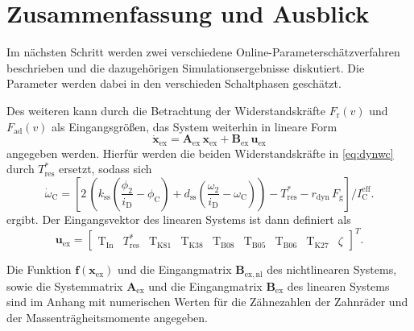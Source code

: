 \chapter{Zusammenfassung und Ausblick}\label{ch:ch4}
Im nächsten Schritt werden zwei verschiedene Online-Parameterschätzverfahren beschrieben und die dazugehörigen Simulationsergebnisse diskutiert. Die Parameter werden dabei in den verschieden Schaltphasen geschätzt.

Des weiteren kann durch die Betrachtung der Widerstandskräfte $F_\mathrm{r}(v)$ und $F_\mathrm{ad}(v)$ als Eingangsgrößen, das System weiterhin in lineare Form
\begin{equation}\label{eq:sys_linex}
\dot{\pmb{x}}_\mathrm{ex} = \pmb{A}_\mathrm{ex}\,\pmb{x}_\mathrm{ex} + \pmb{B}_\mathrm{ex}\,\pmb{u}_\mathrm{ex}
\end{equation}
angegeben werden. Hierfür werden die beiden Widerstandskräfte in \eqref{eq:dynwc} durch $T^*_\mathrm{res}$ ersetzt, sodass sich 
\begin{equation}\label{eq:dynwc_lin}
\dot{\omega}_\mathrm{C} = \left[ 2\,\left(k_\mathrm{ss}\left(\frac{\phi_2}{i_{\mathrm{D}}} - \phi_\mathrm{C}\right) + d_\mathrm{ss}\left(\frac{\omega_2}{i_{\mathrm{D}}} - \omega_\mathrm{C}\right)\right) - T^*_\mathrm{res} - r_\mathrm{dyn}\, F_\mathrm{g}\right]/I^\mathrm{eff}_\mathrm{C}.
\end{equation}
 ergibt. Der Eingangsvektor des linearen Systems ist dann definiert als 
\begin{equation}
\pmb{u}_\mathrm{ex} = \begin{bmatrix} \mathrm{T}_{\mathrm{In}} & T^*_\mathrm{res} & \mathrm{T}_{\mathrm{K81}} & \mathrm{T}_{\mathrm{K38}} & \mathrm{T}_{\mathrm{B08}} & \mathrm{T}_{\mathrm{B05}} & \mathrm{T}_{\mathrm{B06}} & \mathrm{T}_{\mathrm{K27}} & \zeta \end{bmatrix}^T.
\end{equation}

Die Funktion $\pmb{f}(\pmb{x}_\mathrm{ex})$ und die Eingangmatrix $\pmb{B}_\mathrm{ex,nl}$ des nichtlinearen Systems, sowie die Systemmatrix $\pmb{A}_\mathrm{ex}$ und die Eingangmatrix $\pmb{B}_\mathrm{ex}$ des linearen Systems sind im Anhang mit numerischen Werten für die Zähnezahlen der Zahnräder und der Massenträgheitsmomente angegeben.


